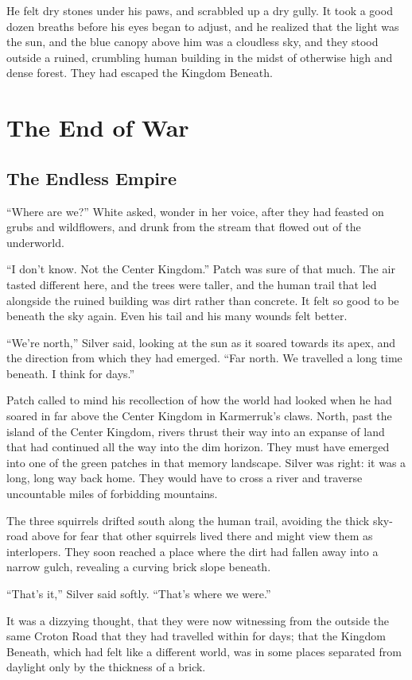 \documentclass[ebook,oneside,openany,17pt]{memoir}
\renewcommand{\thechapter}{\Roman{chapter}}
\newcounter{sections}
\newcommand{\sections}[1]{%
  \section*{#1}
  \addtocounter{sections}{1}%
  \pdfbookmark[1]{#1}{section.\thechapter.\thesections}}
\begin{document}
He felt dry stones under his paws, and scrabbled up a dry gully. It
took a good dozen breaths before his eyes began to adjust, and he
realized that the light was the sun, and the blue canopy above him was
a cloudless sky, and they stood outside a ruined, crumbling human
building in the midst of otherwise high and dense forest. They had
escaped the Kingdom Beneath.


\chapter{The End of War}

\sections{The Endless Empire}

“Where are we?” White asked, wonder in her voice, after they had
feasted on grubs and wildflowers, and drunk from the stream that
flowed out of the underworld.

“I don’t know. Not the Center Kingdom.” Patch was sure of that
much. The air tasted different here, and the trees were taller, and
the human trail that led alongside the ruined building was dirt rather
than concrete. It felt so good to be beneath the sky again. Even his
tail and his many wounds felt better.

“We’re north,” Silver said, looking at the sun as it soared towards
its apex, and the direction from which they had emerged. “Far
north. We travelled a long time beneath. I think for days.”

Patch called to mind his recollection of how the world had looked when
he had soared in far above the Center Kingdom in Karmerruk’s
claws. North, past the island of the Center Kingdom, rivers thrust
their way into an expanse of land that had continued all the way into
the dim horizon. They must have emerged into one of the green patches
in that memory landscape. Silver was right: it was a long, long way
back home. They would have to cross a river and traverse uncountable
miles of forbidding mountains.

The three squirrels drifted south along the human trail, avoiding the
thick sky-road above for fear that other squirrels lived there and
might view them as interlopers. They soon reached a place where the
dirt had fallen away into a narrow gulch, revealing a curving brick
slope beneath.

“That’s it,” Silver said softly. “That’s where we were.”

It was a dizzying thought, that they were now witnessing from the
outside the same Croton Road that they had travelled within for days;
that the Kingdom Beneath, which had felt like a different world, was
in some places separated from daylight only by the thickness of a
brick.
\end{document}
